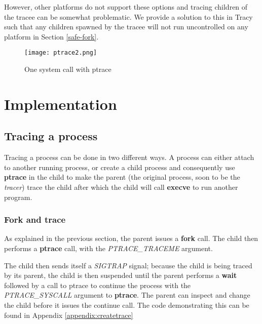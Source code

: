 \documentclass[a4paper, 10pt]{report}
\begin{document}
However, other platforms do not support these options and tracing
children of the tracee can be somewhat problematic.
We provide a solution
to this in Tracy such that any children spawned by the tracee will not
run uncontrolled on any platform in Section \ref{safe-fork}.

\begin{figure}
\texttt{[image: ptrace2.png]}
\caption{One system call with ptrace}
\label{fig2}
\end{figure}


\chapter{Implementation}

\section{Tracing a process}

Tracing a process can be done in two different ways. A process can either attach
to another running process, or create a child process and consequently use
\textbf{ptrace} in the child to make the parent (the original process, soon to
be the \textit{tracer}) trace the child after which the child will
call \textbf{execve} to run another program.

\subsection{Fork and trace}

As explained in the previous section, the parent issues a \textbf{fork} call.
The child then performs a \textbf{ptrace} call, with the \textit{PTRACE\_TRACEME} argument.

The child then sends itself a \textit{SIGTRAP} signal; because the child is being
traced by its parent, the child is then suspended until the parent performs
a \textbf{wait} followed by a call to ptrace to continue the process with the
\textit{PTRACE\_SYSCALL} argument to \textbf{ptrace}.
The parent can inspect and change the child before it issues
the continue call. The code demonstrating this can be found in
Appendix \ref{appendix:createtrace}
\end{document}
